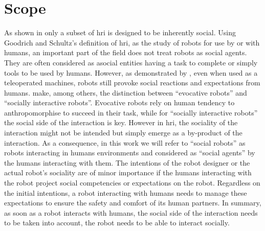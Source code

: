 \section{Scope}\label{sec:intro-scope}

As shown in \cite{goodrich2007human} only a subset of \gls{hri} is designed to be inherently social. Using Goodrich and Schultz's definition of \gls{hri}, as the study of robots for use by or with humans, an important part of the field does not treat robots as social agents. They are often considered as asocial entities having a task to complete or simply tools to be used by humans. However, as demonstrated by \cite{fincannon2004evidence}, even when used as a teleoperated machines, robots still provoke social reactions and expectations from humans. \cite{fong2003survey} make, among others, the distinction between ``evocative robots'' and ``socially interactive robots''. Evocative robots rely on human tendency to anthropomorphise to succeed in their task, while for ``socially interactive robots'' the social side of the interaction is key. However in \gls{hri}, the sociality of the interaction might not be intended but simply emerge as a by-product of the interaction. As a consequence, in this work we will refer to ``social robots'' as robots interacting in humans environments and considered as ``social agents'' by the humans interacting with them. The intentions of the robot designer or the actual robot's sociality are of minor importance if the humans interacting with the robot project social competencies or expectations on the robot. Regardless on the initial intentions, a robot interacting with humans needs to manage these expectations to ensure the safety and comfort of its human partners. In summary, as soon as a robot interacts with humans, the social side of the interaction needs to be taken into account, the robot needs to be able to interact socially. 


